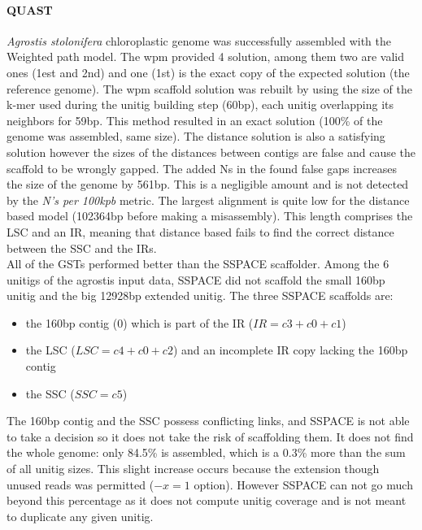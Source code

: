 \documentclass[12pt]{article}
\begin{document}
\paragraph*{QUAST} 
\textit{Agrostis stolonifera}  chloroplastic genome was successfully assembled with the Weighted path model. The wpm provided 4 solution, among them two are valid ones (1est and 2nd) and one (1st) is the exact copy of the expected solution (the reference genome). The wpm scaffold solution was rebuilt by using the size of the k-mer used during the unitig building step (60bp), each unitig overlapping its neighbors for 59bp. This method resulted in an exact solution (100\% of the genome was assembled, same size). The distance solution is also a satisfying solution however the sizes of the distances between contigs are false and cause the scaffold to be wrongly gapped. The added Ns in the found false gaps increases the size of the genome by 561bp. This is a negligible amount and is not detected by the \textit{N's per 100kpb} metric. The largest alignment is quite low for the distance based model (102364bp before making a misassembly). This length comprises the LSC and an IR, meaning that distance based fails to find the correct distance between the SSC and the IRs. \\ All of the GSTs performed better than the SSPACE scaffolder. Among the 6 unitigs of the agrostis input data, SSPACE did not scaffold the small 160bp unitig and the big 12928bp extended unitig. The three SSPACE scaffolds are:
\begin{itemize}
\item the 160bp contig (0) which is part of the IR ($IR=c3+c0+c1$)
\item the LSC ($LSC=c4+c0+c2$) and an incomplete IR copy lacking the 160bp contig
\item the SSC ($SSC=c5$)
\end{itemize}
The 160bp contig and the SSC possess conflicting links, and SSPACE is not able to take a decision so it does not take the risk of scaffolding them. It does not find the whole genome: only 84.5\% is assembled, which is a 0.3\% more than the sum of all unitig sizes. This slight increase occurs because the extension though unused reads was permitted ($-x=1$ option). However SSPACE can not go much beyond this percentage as it does not compute unitig coverage and is not meant to duplicate any given unitig. 
\end{document}
